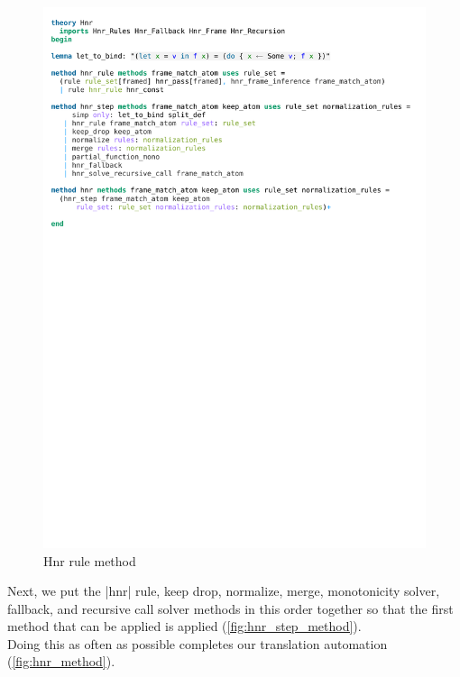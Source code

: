 \begin{figure}[htpb]
    \includegraphics[trim={0 25cm 0 3,4cm}, clip, width=1.00\textwidth]{figures/Theory_Hnr.pdf}
    \caption[Hnr rule method]{Hnr rule method}
    \label{fig:hnr_rule_method}
\end{figure}

\noindent Next, we put the |hnr| rule, keep drop, normalize, merge, monotonicity solver, fallback, and recursive call solver methods in this order together so that the first method that can be applied is applied (\autoref{fig:hnr_step_method}).\\
Doing this as often as possible completes our translation automation (\autoref{fig:hnr_method}).

